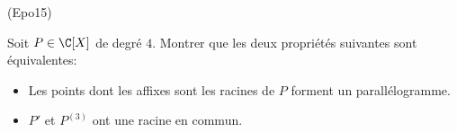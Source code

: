 \begin{tiny}(Epo15)\end{tiny}
Soit $P\in \C[X]$ de degré $4$. Montrer que les deux propriétés suivantes sont équivalentes:
\begin{itemize}
 \item Les points dont les affixes sont les racines de $P$ forment un parallélogramme.
\item $P'$ et $P^{(3)}$ ont une racine en commun.
\end{itemize}
